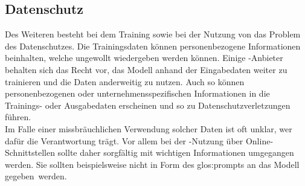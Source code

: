 \documentclass[../main.tex]{subfiles}
\begin{document}
\subsection{Datenschutz}
\label{sec:datenschutz}

Des Weiteren besteht bei dem Training sowie bei der Nutzung von  das Problem des Datenschutzes. Die Trainingsdaten können personenbezogene Informationen beinhalten, welche ungewollt 
wiedergeben werden können. Einige -Anbieter behalten sich das Recht vor, das Modell anhand der 
Eingabedaten weiter zu trainieren und die Daten anderweitig zu nutzen\cite{OpenAI_Datenschutzerklaerung_2025,MistralAI_Terms_2025}. Auch so können personenbezogenen oder unternehmensspezifischen Informationen in die Trainings- oder Ausgabedaten 
erscheinen und so zu Datenschutzverletzungen führen.\\ Im Falle einer missbräuchlichen Verwendung solcher Daten ist oft unklar, wer dafür die Verantwortung trägt. Vor allem bei der -Nutzung 
über Online-Schnittstellen sollte daher sorgfältig mit wichtigen Informationen umgegangen werden. Sie sollten beispielsweise nicht in Form des \gls{glos:prompt}s an das Modell \mbox{gegeben werden.\cite{datenschute}}
\end{document}

